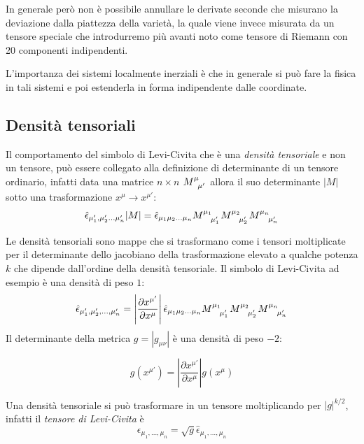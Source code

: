 \documentclass[twoside]{article}
\begin{document}
In generale però non è possibile annullare le derivate seconde che misurano la deviazione dalla piattezza della varietà, la quale viene invece misurata da un tensore speciale che introdurremo più avanti noto come tensore di Riemann con 20 componenti indipendenti.

L'importanza dei sistemi localmente inerziali è che in generale si può fare la fisica in tali sistemi e poi estenderla in forma indipendente dalle coordinate.

\subsection{Densità tensoriali}
Il comportamento del simbolo di Levi-Civita che è una \emph{densità tensoriale} e non un tensore, può essere collegato alla definizione di determinante di un tensore ordinario, infatti data una matrice $n\times n$ $M\indices{^\mu_{\mu'}}$ allora il suo determinante $|M|$ sotto una trasformazione $x^{\mu} \rightarrow x^{\mu'}$:
\begin{equation*}
	\hat{\epsilon}_{\mu'_1,\mu'_2\ldots\mu'_n} |M| = \hat{\epsilon}_{\mu_1\mu_2\ldots\mu_n} M\indices{^{\mu_1}_{\mu'_1}} M\indices{^{\mu_2}_{\mu'_2}} M\indices{^{\mu_n}_{\mu'_n}}
\end{equation*}

Le densità tensoriali sono mappe che si trasformano come i tensori moltiplicate per il determinante dello jacobiano della trasformazione elevato a qualche potenza $k$ che dipende dall'ordine della densità tensoriale.
Il simbolo di Levi-Civita ad esempio è una densità di peso $1$:
\begin{equation*}
	\hat{\epsilon}_{\mu_1',\mu_2',\ldots,\mu_n'} = \left| \dfrac{\partial x^{\mu'}}{\partial x^{\mu}} \right|  \hat{\epsilon}_{\mu_1\mu_2\ldots\mu_n} M\indices{^{\mu_1}_{\mu'_1}} M\indices{^{\mu_2}_{\mu'_2}} M\indices{^{\mu_n}_{\mu'_n}}
\end{equation*}
Il determinante della metrica $g=|g_{\mu\nu}|$ è una densità di peso $-2$:

\begin{equation*}
	g(x^{\mu'}) = \left| \frac{\partial x^{\mu'}}{\partial x^{\mu}} \right| g(x^{\mu})
\end{equation*}

Una densità tensoriale si può trasformare in un tensore moltiplicando per $|g|^{k/2}$, infatti il \emph{tensore di Levi-Civita} è
\begin{equation}
	\epsilon_{\mu_1,\ldots,\mu_n} = \sqrt{g}\hat{\epsilon}_{\mu_1,\ldots,\mu_n}
\end{equation}
\end{document}
